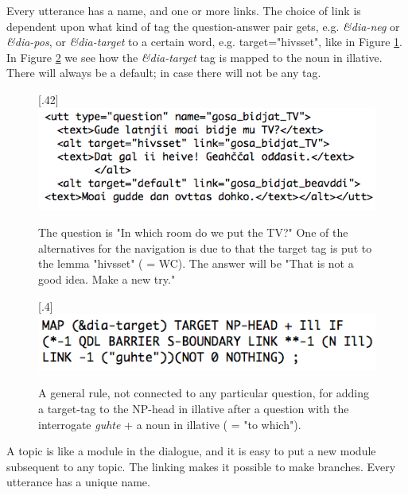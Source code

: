 \documentclass[11pt]{article}
\begin{document}
Every utterance has a name, and one or more links. The choice of link is dependent upon what kind of tag the question-answer pair gets, e.g. \textit{\&dia-neg} or \textit{\&dia-pos}, or \textit{\&dia-target} to a certain word, e.g. target="hivsset", like in Figure \ref{TV}.  In Figure \ref{targetIll} we see how the \textit{\&dia-target} tag is mapped to the noun in illative. There will always be a default; in case there will not be any tag. \\

\begin{figure}[htbp]
\begin{center}
\scalebox{.40}[.42]{\includegraphics{presentation/img/gosabidjatTV2.png}}
\caption{The question is "In which room do we put the TV?" One of the alternatives for the navigation is due to that the target tag is put to the lemma "hivsset" ( = WC). The answer will be "That is not a good idea. Make a new try."}
\label{TV}
\end{center}
\end{figure}


\begin{figure}[htbp]
\begin{center}
\scalebox{.4}[.4]{\includegraphics{presentation/img/targetIll2.png}}
\caption{A general rule, not connected to any particular question, for adding a target-tag to the NP-head in illative after a question with the interrogate \textit{guhte} + a noun in illative ( = "to which").}
\label{targetIll}
\end{center}
\end{figure}

A topic is like a module in the dialogue, and it is easy to put a new module subsequent to any topic. The linking makes it possible to make branches. Every utterance has a unique name.  
\end{document}
